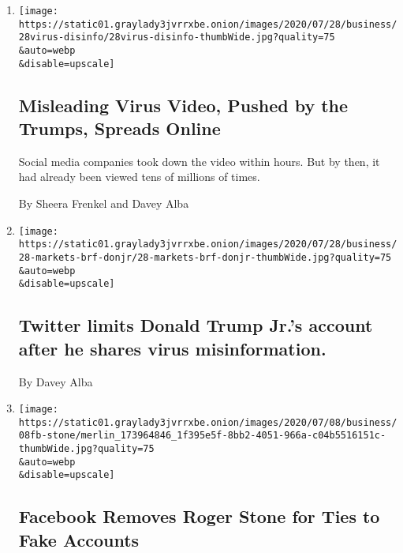 \begin{enumerate}
\def\labelenumi{\arabic{enumi}.}
\item
  \href{/2020/07/28/technology/virus-video-trump.html}{}

  \texttt{[image: https://static01.graylady3jvrrxbe.onion/images/2020/07/28/business/28virus-disinfo/28virus-disinfo-thumbWide.jpg?quality=75\\\&auto=webp\\\&disable=upscale]}

  \hypertarget{misleading-virus-video-pushed-by-the-trumps-spreads-online}{%
  \subsection{Misleading Virus Video, Pushed by the Trumps, Spreads
  Online}\label{misleading-virus-video-pushed-by-the-trumps-spreads-online}}

  Social media companies took down the video within hours. But by then,
  it had already been viewed tens of millions of times.

  By Sheera Frenkel and Davey Alba
\item
  \href{/2020/07/28/business/twitter-limits-donald-trump-jrs-account-after-he-shares-virus-misinformation.html}{}

  \texttt{[image: https://static01.graylady3jvrrxbe.onion/images/2020/07/28/business/28-markets-brf-donjr/28-markets-brf-donjr-thumbWide.jpg?quality=75\\\&auto=webp\\\&disable=upscale]}

  \hypertarget{twitter-limits-donald-trump-jrs-account-after-he-shares-virus-misinformation}{%
  \subsection{Twitter limits Donald Trump Jr.'s account after he shares
  virus
  misinformation.}\label{twitter-limits-donald-trump-jrs-account-after-he-shares-virus-misinformation}}

  By Davey Alba
\item
  \href{/2020/07/08/technology/roger-stone-facebook.html}{}

  \texttt{[image: https://static01.graylady3jvrrxbe.onion/images/2020/07/08/business/08fb-stone/merlin\_173964846\_1f395e5f-8bb2-4051-966a-c04b5516151c-thumbWide.jpg?quality=75\\\&auto=webp\\\&disable=upscale]}

  \hypertarget{facebook-removes-roger-stone-for-ties-to-fake-accounts}{%
  \subsection{Facebook Removes Roger Stone for Ties to Fake
  Accounts}\label{facebook-removes-roger-stone-for-ties-to-fake-accounts}}


\end{enumerate}
